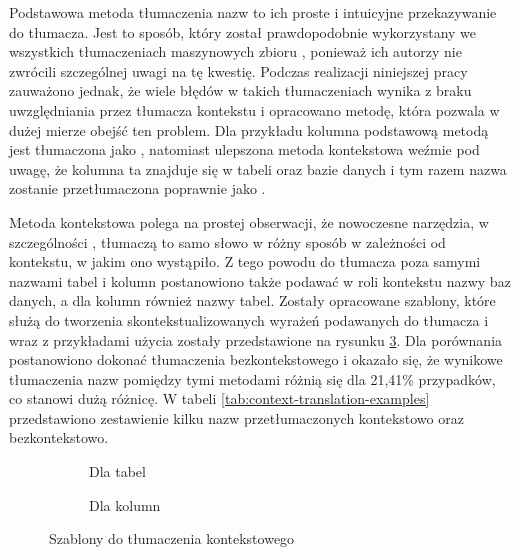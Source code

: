 Podstawowa metoda tłumaczenia nazw to ich proste i intuicyjne przekazywanie do tłumacza. Jest to sposób, który został prawdopodobnie wykorzystany we wszystkich tłumaczeniach maszynowych zbioru , ponieważ ich autorzy nie zwrócili szczególnej uwagi na tę kwestię. Podczas realizacji niniejszej pracy zauważono jednak, że wiele błędów w takich tłumaczeniach wynika z braku uwzględniania przez tłumacza kontekstu i opracowano metodę, która pozwala w dużej mierze obejść ten problem. Dla przykładu kolumna  podstawową metodą jest tłumaczona jako , natomiast ulepszona metoda kontekstowa weźmie pod uwagę, że kolumna ta znajduje się w tabeli  oraz bazie danych  i tym razem nazwa zostanie przetłumaczona poprawnie jako .

Metoda kontekstowa polega na prostej obserwacji, że nowoczesne narzędzia, w szczególności , tłumaczą to samo słowo w różny sposób w zależności od kontekstu, w jakim ono wystąpiło. Z tego powodu do tłumacza poza samymi nazwami tabel i kolumn postanowiono także podawać w roli kontekstu nazwy baz danych, a dla kolumn również nazwy tabel. Zostały opracowane szablony, które służą do tworzenia skontekstualizowanych wyrażeń podawanych do tłumacza i wraz z przykładami użycia zostały przedstawione na rysunku \ref{fig:translation-in-context}. Dla porównania postanowiono dokonać tłumaczenia bezkontekstowego i okazało się, że wynikowe tłumaczenia nazw pomiędzy tymi metodami różnią się dla 21,41\% przypadków, co stanowi dużą różnicę. W tabeli \ref{tab:context-translation-examples} przedstawiono zestawienie kilku nazw przetłumaczonych kontekstowo oraz bezkontekstowo.

\begin{figure}[ht!]
\centering
\begin{subfigure}{0.49\textwidth}
    
    \caption{Dla tabel}
    \label{fig:first}
\end{subfigure}
\hfill
\begin{subfigure}{0.49\textwidth}
    
    \caption{Dla kolumn}
    \label{fig:second}
\end{subfigure}
\caption{Szablony do tłumaczenia kontekstowego}
\label{fig:translation-in-context}
\end{figure}

